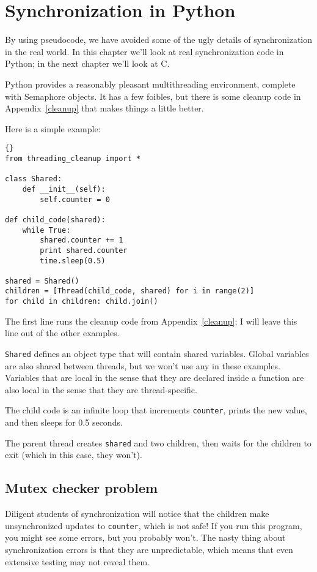 \documentclass{book}
\begin{document}
\chapter{Synchronization in Python}
\label{pysync}

By using pseudocode, we have avoided some of the ugly
details of synchronization in the real world.  In this chapter
we'll look at real synchronization code in Python; in the
next chapter we'll look at C.

Python provides a reasonably pleasant multithreading environment,
complete with Semaphore objects.  It has
a few foibles, but there is some cleanup code in Appendix~\ref{cleanup}
that makes things a little better.

Here is a simple example:

\begin{lstlisting}[title={}]{}
from threading_cleanup import *

class Shared:
    def __init__(self):
        self.counter = 0

def child_code(shared):
    while True:
        shared.counter += 1
        print shared.counter
        time.sleep(0.5)

shared = Shared()
children = [Thread(child_code, shared) for i in range(2)]
for child in children: child.join()
\end{lstlisting}

The first line runs the cleanup code from Appendix~\ref{cleanup};
I will leave this line out of the other examples.

{\tt Shared} defines an object type that will contain shared variables.
Global variables are also shared between threads, but we won't
use any in these examples.  Variables that are local in the sense
that they are declared inside a function are also local in the
sense that they are thread-specific.

The child code is an infinite loop that increments {\tt counter},
prints the new value, and then sleeps for 0.5 seconds.

The parent thread creates {\tt shared} and two children,
then waits for the children to exit (which in this case, they won't).

\section{Mutex checker problem}

Diligent students of synchronization will notice that the
children make unsynchronized updates to {\tt counter}, which
is not safe!  If you run this program, you might see some
errors, but you probably won't.  The nasty thing about synchronization
errors is that they are unpredictable, which means that even
extensive testing may not reveal them.
\end{document}
